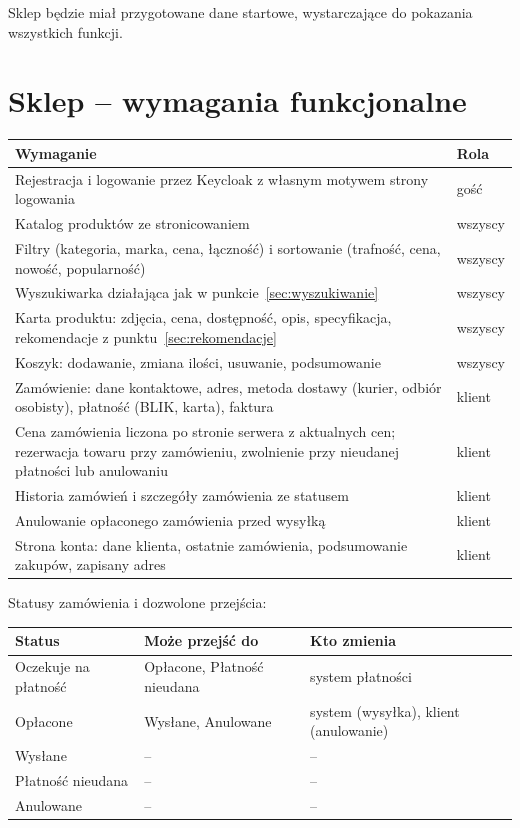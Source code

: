 \documentclass[11pt,a4paper]{article}
\begin{document}
Sklep będzie miał przygotowane dane startowe, wystarczające do pokazania wszystkich funkcji.

\section{Sklep -- wymagania funkcjonalne}

{\small
\begin{tabularx}{\textwidth}{LP{1.5cm}}
\toprule
\textbf{Wymaganie} & \textbf{Rola} \\
\midrule
Rejestracja i logowanie przez Keycloak z własnym motywem strony logowania & gość \\
Katalog produktów ze stronicowaniem & wszyscy \\
Filtry (kategoria, marka, cena, łączność) i sortowanie (trafność, cena, nowość, popularność) & wszyscy \\
Wyszukiwarka działająca jak w punkcie~\ref{sec:wyszukiwanie} & wszyscy \\
Karta produktu: zdjęcia, cena, dostępność, opis, specyfikacja, rekomendacje
z punktu~\ref{sec:rekomendacje} & wszyscy \\
Koszyk: dodawanie, zmiana ilości, usuwanie, podsumowanie & wszyscy \\
Zamówienie: dane kontaktowe, adres, metoda dostawy (kurier, odbiór osobisty), płatność (BLIK, karta),
faktura & klient \\
Cena zamówienia liczona po stronie serwera z aktualnych cen; rezerwacja towaru przy zamówieniu, zwolnienie
przy nieudanej płatności lub anulowaniu & klient \\
Historia zamówień i szczegóły zamówienia ze statusem & klient \\
Anulowanie opłaconego zamówienia przed wysyłką & klient \\
Strona konta: dane klienta, ostatnie zamówienia, podsumowanie zakupów, zapisany adres & klient \\
\bottomrule
\end{tabularx}\par\medskip
}

\filbreak
Statusy zamówienia i dozwolone przejścia:

{\small
\begin{tabularx}{\textwidth}{P{4cm}LP{3.2cm}}
\toprule
\textbf{Status} & \textbf{Może przejść do} & \textbf{Kto zmienia} \\
\midrule
Oczekuje na płatność & Opłacone, Płatność nieudana & system płatności \\
Opłacone & Wysłane, Anulowane & system (wysyłka), klient (anulowanie) \\
Wysłane & -- & -- \\
Płatność nieudana & -- & -- \\
Anulowane & -- & -- \\
\bottomrule
\end{tabularx}\par\medskip
}
\end{document}
